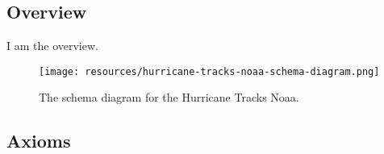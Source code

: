 \subsection{Overview}
\label{ssec:overview}

I am the overview.

\begin{figure}[h!]
  \begin{center}
    \texttt{[image: resources/hurricane-tracks-noaa-schema-diagram.png]}
  \end{center}
  \caption{The schema diagram for the Hurricane Tracks Noaa.}
  \label{fig:ov-diagram}
\end{figure}


\subsection{Axioms}
